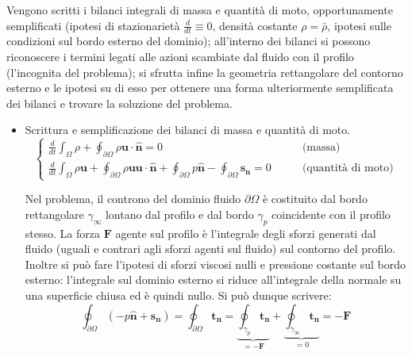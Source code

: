\parttwo
 Vengono scritti i bilanci integrali di massa e quantità di moto, opportunamente semplificati (ipotesi di stazionarietà $\frac{d}{dt} \equiv 0$, densità costante $\rho = \bar{\rho}$, ipotesi sulle condizioni sul bordo esterno del dominio); all'interno dei bilanci si possono riconoscere i termini legati alle azioni scambiate dal fluido con il profilo
 (l'incognita del problema); si sfrutta infine la geometria rettangolare del contorno esterno e le ipotesi su di esso per ottenere una forma ulteriormente semplificata dei bilanci e trovare la soluzione del problema.

\begin{itemize}
  \item Scrittura e semplificazione dei bilanci di massa e quantità di moto.
    \begin{equation}
      \begin{cases}
       \frac{d}{d t} \int_{\Omega} \rho + \oint_{\partial \Omega} \rho \bm{u} \cdot \hat{\bm{n}} = 0 & \qquad \text{(massa)} \\
       \frac{d}{d t} \int_{\Omega} \rho \bm{u} + \oint_{\partial \Omega} \rho \bm{u} \bm{u} \cdot \hat{\bm{n}} +
        \oint_{\partial \Omega} p \hat{\bm{n}} - \oint_{\partial \Omega} \bm{s_n} = 0  
        & \qquad \text{(quantità di moto)}  %
      \end{cases}
    \end{equation}


Nel problema, il controno del dominio fluido $\partial \Omega$ è costituito dal bordo rettangolare $\gamma_\infty$ lontano dal profilo e dal bordo $\gamma_p$ coincidente con il profilo stesso. La forza $\bm{F}$ agente sul profilo è l'integrale degli sforzi generati dal fluido (uguali e contrari agli sforzi agenti sul fluido) sul contorno del profilo. Inoltre si può fare l'ipotesi di sforzi viscosi nulli e pressione costante sul bordo esterno: l'integrale sul dominio esterno si riduce all'integrale della normale su una superficie chiusa ed è quindi nullo. Si può dunque scrivere:
\begin{equation}
 \oint_{\partial \Omega} (-p \hat{\bm{n}} + \bm{s_n}) = \oint_{\partial \Omega} \bm{t_n} = \underbrace{\oint_{\gamma_p} \bm{t_n}}_{=-\bm{F}} + \underbrace{\oint_{\gamma_\infty} \bm{t_n}}_{=0} = -\bm{F}
\end{equation}


\end{itemize}

